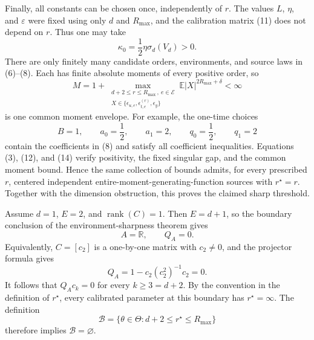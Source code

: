 Finally, all constants can be chosen once, independently of \(r\).  The values \(L\), \(\eta\), and \(\varepsilon\) were fixed using only \(d\) and \(R_{\max}\), and the calibration matrix (11) does not depend on \(r\).  Thus one may take
\[
 \kappa_0=\frac12\eta\sigma_d(V_d)>0.
\]
There are only finitely many candidate orders, environments, and source laws in (6)--(8).  Each has finite absolute moments of every positive order, so
\[
 M
 =1+\max_{\substack{d+2\leq r\leq R_{\max}\,,\ e\in\mathcal E\\
 X\in\{\epsilon_{u,e},\epsilon^{(r)}_{t,e},\epsilon_y\}}}
 \mathbb E|X|^{2R_{\max}+\delta}
 <\infty
 \tag{14}
\]
is one common moment envelope.  For example, the one-time choices
\[
 B=1,
 \qquad a_0=\frac12,
 \qquad a_1=2,
 \qquad q_0=\frac12,
 \qquad q_1=2
\]
contain the coefficients in (8) and satisfy all coefficient inequalities.  Equations (3), (12), and (14) verify positivity, the fixed singular gap, and the common moment bound.  Hence the same collection of bounds admits, for every prescribed \(r\), centered independent entire-moment-generating-function sources with \(r^\star=r\).  Together with the dimension obstruction, this proves the claimed sharp threshold.

Assume \(d=1\), \(E=2\), and \(\operatorname{rank}(C)=1\).  Then \(E=d+1\), so the boundary conclusion of the environment-sharpness theorem gives
\[
 A=\mathbb R,
 \qquad
 Q_A=0.
\]
Equivalently, \(C=[c_2]\) is a one-by-one matrix with \(c_2\neq0\), and the projector formula gives
\[
 Q_A
 =1-c_2(c_2^2)^{-1}c_2
 =0.
\]
It follows that \(Q_Ac_k=0\) for every \(k\geq3=d+2\).  By the convention in the definition of \(r^\star\), every calibrated parameter at this boundary has \(r^\star=\infty\).  The definition
\[
 \mathcal B=\{\theta\in\Theta:d+2\leq r^\star\leq R_{\max}\}
\]
therefore implies \(\mathcal B=\varnothing\).

